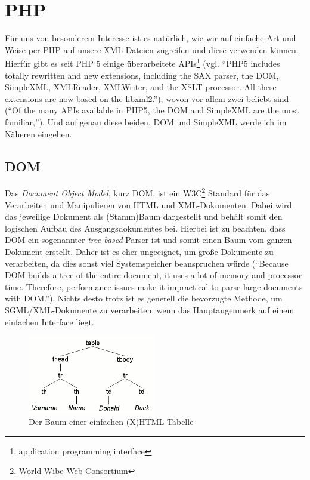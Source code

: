 \section{PHP}\label{xml-php}
Für uns von besonderem Interesse ist es natürlich, wie wir auf
einfache Art und Weise per PHP auf unsere XML Dateien zugreifen und
diese verwenden können. Hierfür gibt es seit PHP 5 einige
überarbeitete APIs\footnote{application programming interface} (vgl.
\enquote{PHP5 includes totally rewritten and new extensions, including
  the SAX parser, the DOM, SimpleXML, XMLReader, XMLWriter, and the
  XSLT processor. All these extensions are now based on the
  libxml2.}\cite{www:ibm:xml}), wovon vor allem zwei beliebt sind
(\enquote{Of the many APIs available in PHP5, the DOM and SimpleXML
  are the most familiar,}\cite{www:ibm:xml}). Und auf genau diese
beiden, DOM und SimpleXML werde ich im Näheren eingehen.
\newpage
\subsection{DOM}
Das {\em Document Object Model}, kurz DOM, ist ein W3C\footnote{World
  Wibe Web Consortium} Standard für das Verarbeiten und Manipulieren
von HTML und XML-Dokumenten. Dabei wird das jeweilige Dokument als
(Stamm)Baum dargestellt und behält somit den logischen Aufbau des
Ausgangsdokumentes bei. Hierbei ist zu beachten, dass DOM ein
sogenannter {\em tree-based} Parser ist und somit einen Baum vom
ganzen Dokument erstellt. Daher ist es eher ungeeignet, um große
Dokumente zu verarbeiten, da dies sonst viel Systemspeicher
beanspruchen würde (\enquote{Because DOM builds a tree of the entire
  document, it uses a lot of memory and processor time. Therefore,
  performance issues make it impractical to parse large documents with
  DOM.}\cite{www:ibm:xml}). Nichts desto trotz ist es generell die
bevorzugte Methode, um SGML/XML-Dokumente zu verarbeiten, wenn das
Hauptaugenmerk auf einem einfachen Interface liegt.
\begin{figure}[hb]
  \includegraphics[width=0.5\textwidth]{images/dom}
  \caption{Der Baum einer einfachen (X)HTML Tabelle\cite{wiki:de:dom}}
\end{figure}


